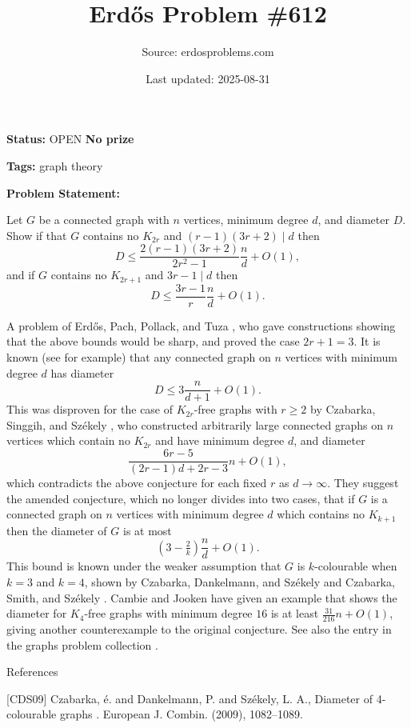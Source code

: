 \documentclass{article}
\title{Erd\H{o}s Problem \#612}
\date{Last updated: 2025-08-31}
\author{Source: erdosproblems.com}
\begin{document}
\maketitle

\noindent\textbf{Status:} OPEN \quad \textbf{No prize}

\noindent\textbf{Tags:} graph theory

\medskip

\noindent\textbf{Problem Statement:}

Let $G$ be a connected graph with $n$ vertices, minimum degree $d$, and diameter $D$. Show if that $G$ contains no $K_{2r}$ and $(r-1)(3r+2)\mid d$ then\[D\leq \frac{2(r-1)(3r+2)}{2r^2-1}\frac{n}{d}+O(1),\]and if $G$ contains no $K_{2r+1}$ and $3r-1 \mid d$ then\[D\leq \frac{3r-1}{r}\frac{n}{d}+O(1).\]




A problem of Erd\H{o}s, Pach, Pollack, and Tuza \cite{EPPT89}, who gave constructions showing that the above bounds would be sharp, and proved the case $2r+1=3$. It is known (see \cite{EPPT89} for example) that any connected graph on $n$ vertices with minimum degree $d$ has diameter\[D\leq 3\frac{n}{d+1}+O(1).\]This was disproven for the case of $K_{2r}$-free graphs with $r\geq 2$ by Czabarka, Singgih, and Sz\'{e}kely \cite{CSS21}, who constructed arbitrarily large connected graphs on $n$ vertices which contain no $K_{2r}$ and have minimum degree $d$, and diameter\[\frac{6r-5}{(2r-1)d+2r-3}n+O(1),\]which contradicts the above conjecture for each fixed $r$ as $d\to \infty$. They suggest the amended conjecture, which no longer divides into two cases, that if $G$ is a connected graph on $n$ vertices with minimum degree $d$ which contains no $K_{k+1}$ then the diameter of $G$ is at most\[(3-\tfrac{2}{k})\frac{n}{d}+O(1).\]This bound is known under the weaker assumption that $G$ is $k$-colourable when $k=3$ and $k=4$, shown by Czabarka, Dankelmann, and Sz\'{e}kely \cite{CDS09} and Czabarka, Smith, and Sz\'{e}kely \cite{CSS23}. Cambie and Jooken \cite{CaJo25} have given an example that shows the diameter for $K_4$-free graphs with minimum degree $16$ is at least $\frac{31}{216}n+O(1)$, giving another counterexample to the original conjecture. See also the entry in the graphs problem collection .




References

[CDS09] Czabarka, \'{e}. and Dankelmann, P. and Sz\'{e}kely, L. A., Diameter of 4-colourable graphs . European J. Combin. (2009), 1082--1089.
\end{document}
